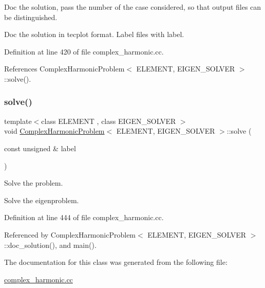 Doc the solution, pass the number of the case considered, so that output files can be distinguished. 

Doc the solution in tecplot format. Label files with label. 

Definition at line 420 of file complex\+\_\+harmonic.\+cc.



References Complex\+Harmonic\+Problem$<$ E\+L\+E\+M\+E\+N\+T, E\+I\+G\+E\+N\+\_\+\+S\+O\+L\+V\+E\+R $>$\+::solve().

\mbox{\label{classComplexHarmonicProblem_a3453c3c11a76fbab8c6383b52b6b33d7}} 
\subsubsection{\texorpdfstring{solve()}{solve()}}
{\footnotesize\ttfamily template$<$class E\+L\+E\+M\+E\+NT , class E\+I\+G\+E\+N\+\_\+\+S\+O\+L\+V\+ER $>$ \\
void \hyperlink{classComplexHarmonicProblem}{Complex\+Harmonic\+Problem}$<$ E\+L\+E\+M\+E\+NT, E\+I\+G\+E\+N\+\_\+\+S\+O\+L\+V\+ER $>$\+::solve (\begin{DoxyParamCaption}\item[{const unsigned \&}]{label }\end{DoxyParamCaption})}



Solve the problem. 

Solve the eigenproblem. 

Definition at line 444 of file complex\+\_\+harmonic.\+cc.



Referenced by Complex\+Harmonic\+Problem$<$ E\+L\+E\+M\+E\+N\+T, E\+I\+G\+E\+N\+\_\+\+S\+O\+L\+V\+E\+R $>$\+::doc\+\_\+solution(), and main().



The documentation for this class was generated from the following file\+:\begin{DoxyCompactItemize}
\item 
\hyperlink{complex__harmonic_8cc}{complex\+\_\+harmonic.\+cc}\end{DoxyCompactItemize}
